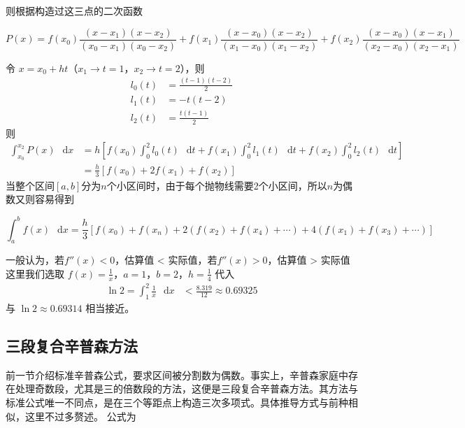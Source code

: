 \documentclass[12pt]{article}
\theoremstyle{definition}
\theoremstyle{plain}
\theoremstyle{definition}
\newcommand{\diff}{\mathop{}\!\mathrm{d}}
\begin{document}
则根据构造过这三点的二次函数

\[P(x) = f\left( x_{0} \right)\frac{\left( x - x_{1} \right)\left( x - x_{2} \right)}{\left( x_{0} - x_{1} \right)\left( x_{0} - x_{2} \right)} + f\left( x_{1} \right)\frac{\left( x - x_{0} \right)\left( x - x_{2} \right)}{\left( x_{1} - x_{0} \right)\left( x_{1} - x_{2} \right)} + f\left( x_{2} \right)\frac{\left( x - x_{0} \right)\left( x - x_{1} \right)}{\left( x_{2} - x_{0} \right)\left( x_{2} - x_{1} \right)}\]

令 \(x = x_{0} + ht\)（\(x_{1} \rightarrow t = 1\)，\(x_{2} \rightarrow t = 2\)），则
\begin{align*}
l_{0}(t) &= \frac{(t - 1)(t - 2)}{2} \\
l_{1}(t) &= -t(t - 2) \\
l_{2}(t) &= \frac{t(t - 1)}{2}
\end{align*}
则
\begin{align*}
\int_{x_{0}}^{x_{2}}P(x)\,\diff x &= h\left\lbrack f\left( x_{0} \right)\int_{0}^{2}l_{0}(t)\,\diff t + f\left( x_{1} \right)\int_{0}^{2}l_{1}(t)\,\diff t + f\left( x_{2} \right)\int_{0}^{2}l_{2}(t)\,\diff t \right\rbrack \\
&= \frac{h}{3}\left\lbrack f\left( x_{0} \right) + 2f\left( x_{1} \right) + f\left( x_{2} \right) \right\rbrack
\end{align*}
当整个区间\([a,b]\)分为\(n\)个小区间时，由于每个抛物线需要2个小区间，所以\(n\)为偶数又则容易得到

\[\int_{a}^{b}f(x)\,\diff x = \frac{h}{3}\left\lbrack f\left( x_{0} \right) + f\left( x_{n} \right) + 2\left( f\left( x_{2} \right) + f\left( x_{4} \right) + \cdots \right) + 4\left( f\left( x_{1} \right) + f\left( x_{3} \right) + \cdots \right) \right\rbrack\]

一般认为，若\(f''(x) < 0\)，估算值 \textless{}
实际值，若\(f''(x) > 0\)，估算值 \textgreater{} 实际值
这里我们选取 \(f(x) = \frac{1}{x}\)，\(a = 1\)，\(b = 2\)，\(h = \frac{1}{4}\) 代入
\begin{align*}
\ln 2 = \int_{1}^{2}\frac{1}{x}\,\diff x &< \frac{8.319}{12} \approx 0.69325
\end{align*}
与 \(\ln 2 \approx 0.69314\) 相当接近。

\subsection{三段复合辛普森方法}

前一节介绍标准辛普森公式，要求区间被分割数为偶数。事实上，辛普森家庭中存在处理奇数段，尤其是三的倍数段的方法，这便是三段复合辛普森方法。其方法与标准公式唯一不同点，是在三个等距点上构造三次多项式。具体推导方式与前种相似，这里不过多赘述。
公式为
\end{document}
